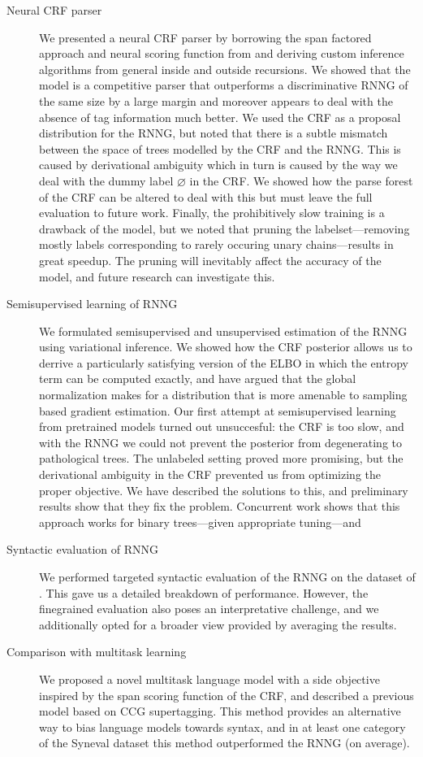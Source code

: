   \begin{description}
    \item[Neural CRF parser]
      We presented a neural CRF parser by borrowing the span factored approach and neural scoring function from \cite{stern2017minimal} and deriving custom inference algorithms from general inside and outside recursions. We showed that the model is a competitive parser that outperforms a discriminative RNNG of the same size by a large margin and moreover appears to deal with the absence of tag information much better. We used the CRF as a proposal distribution for the RNNG, but noted that there is a subtle mismatch between the space of trees modelled by the CRF and the RNNG. This is caused by derivational ambiguity which in turn is caused by the way we deal with the dummy label $\varnothing$ in the CRF. We showed how the parse forest of the CRF can be altered to deal with this but must leave the full evaluation to future work. Finally, the prohibitively slow training is a drawback of the model, but we noted that pruning the labelset---removing mostly labels corresponding to rarely occuring unary chains---results in great speedup. The pruning will inevitably affect the accuracy of the model, and future research can investigate this.

    \item[Semisupervised learning of RNNG]
      We formulated semisupervised and unsupervised estimation of the RNNG using variational inference. We showed how the CRF posterior allows us to derrive a particularly satisfying version of the ELBO in which the entropy term can be computed exactly, and have argued that the global normalization makes for a distribution that is more amenable to sampling based gradient estimation. Our first attempt at semisupervised learning from pretrained models turned out unsuccesful: the CRF is too slow, and with the RNNG we could not prevent the posterior from degenerating to pathological trees. The unlabeled setting proved more promising, but the derivational ambiguity in the CRF prevented us from optimizing the proper objective. We have described the solutions to this, and preliminary results show that they fix the problem. Concurrent work shows that this approach works for binary trees---given appropriate tuning---and

    \item[Syntactic evaluation of RNNG]
      We performed targeted syntactic evaluation of the RNNG on the dataset of \citet{linzen2018targeted}. This gave us a detailed breakdown of performance. However, the finegrained evaluation also poses an interpretative challenge, and we additionally opted for a broader view provided by averaging the results.

    \item[Comparison with multitask learning]
      We proposed a novel multitask language model with a side objective inspired by the span scoring function of the CRF, and described a previous model based on CCG supertagging. This method provides an alternative way to bias language models towards syntax, and in at least one category of the Syneval dataset this method outperformed the RNNG (on average).

  \end{description}

